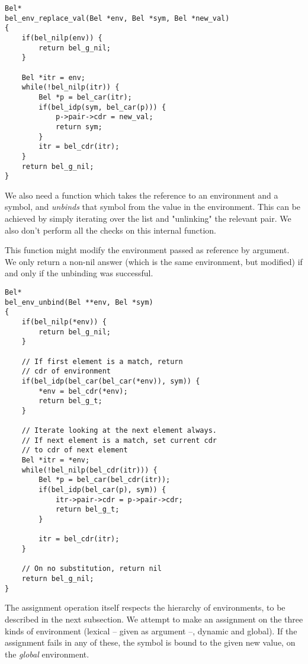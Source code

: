 \documentclass[openright,a4paper,twoside,12pt]{memoir}
\begin{document}
\begin{verbatim}
Bel*
bel_env_replace_val(Bel *env, Bel *sym, Bel *new_val)
{
    if(bel_nilp(env)) {
        return bel_g_nil;
    }
    
    Bel *itr = env;
    while(!bel_nilp(itr)) {
        Bel *p = bel_car(itr);
        if(bel_idp(sym, bel_car(p))) {
            p->pair->cdr = new_val;
            return sym;
        }
        itr = bel_cdr(itr);
    }
    return bel_g_nil;
}
\end{verbatim}

We also need a function which takes the reference to an environment
and a symbol, and \emph{unbinds} that symbol from the value in the
environment. This can be achieved by simply iterating over the list
and "unlinking" the relevant pair. We also don't perform all the
checks on this internal function.

This function might modify the environment passed as reference by
argument. We only return a non-nil answer (which is the same
environment, but modified) if and only if the unbinding was
successful.

\begin{verbatim}
Bel*
bel_env_unbind(Bel **env, Bel *sym)
{
    if(bel_nilp(*env)) {
        return bel_g_nil;
    }
    
    // If first element is a match, return
    // cdr of environment
    if(bel_idp(bel_car(bel_car(*env)), sym)) {
        *env = bel_cdr(*env);
        return bel_g_t;
    }

    // Iterate looking at the next element always.
    // If next element is a match, set current cdr
    // to cdr of next element
    Bel *itr = *env;
    while(!bel_nilp(bel_cdr(itr))) {
        Bel *p = bel_car(bel_cdr(itr));
        if(bel_idp(bel_car(p), sym)) {
            itr->pair->cdr = p->pair->cdr;
            return bel_g_t;
        }
        
        itr = bel_cdr(itr);
    }

    // On no substitution, return nil
    return bel_g_nil;
}
\end{verbatim}

The assignment operation itself respects the hierarchy of
environments, to be described in the next subsection. We attempt to
make an assignment on the three kinds of environment (lexical -- given
as argument --, dynamic and global). If the assignment fails in any of
these, the symbol is bound to the given new value, on the \emph{global}
environment.
\end{document}
